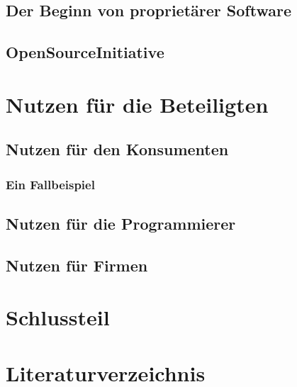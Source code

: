 \documentclass[a4paper,12pt]{article}
\begin{document}
\subsection{Der Beginn von proprietärer Software}
\subsection{OpenSourceInitiative}
\section{Nutzen für die Beteiligten}
\subsection{Nutzen für den Konsumenten}
\subsubsection{Ein Fallbeispiel}
\subsection{Nutzen für die Programmierer}
\subsection{Nutzen für Firmen}
\section{Schlussteil}
\section{Literaturverzeichnis}
\end{document}
